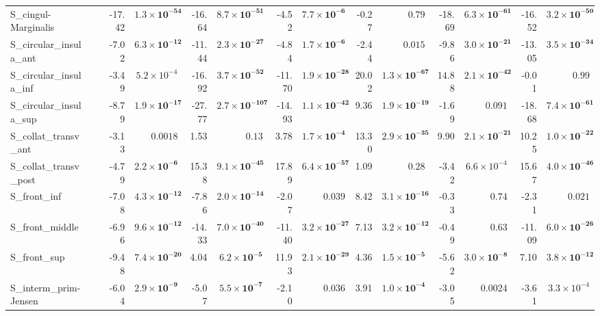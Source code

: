 {\begin{longtable}{llrrrrrrrrrrrr}
S\_cingul-Marginalis &  & -17.42 & $\mathbf{1.3{\times}10^{-54}}$ & -16.64 & $\mathbf{8.7{\times}10^{-51}}$ & -4.52 & $\mathbf{7.7{\times}10^{-6}}$ & -0.27 & $0.79$ & -18.69 & $\mathbf{6.3{\times}10^{-61}}$ & -16.52 & $\mathbf{3.2{\times}10^{-50}}$ \\
S\_circular\_insula\_ant &  & -7.02 & $\mathbf{6.3{\times}10^{-12}}$ & -11.44 & $\mathbf{2.3{\times}10^{-27}}$ & -4.84 & $\mathbf{1.7{\times}10^{-6}}$ & -2.44 & $0.015$ & -9.86 & $\mathbf{3.0{\times}10^{-21}}$ & -13.05 & $\mathbf{3.5{\times}10^{-34}}$ \\
S\_circular\_insula\_inf &  & -3.49 & $5.2{\times}10^{-4}$ & -16.92 & $\mathbf{3.7{\times}10^{-52}}$ & -11.70 & $\mathbf{1.9{\times}10^{-28}}$ & 20.02 & $\mathbf{1.3{\times}10^{-67}}$ & 14.88 & $\mathbf{2.1{\times}10^{-42}}$ & -0.01 & $0.99$ \\
S\_circular\_insula\_sup &  & -8.79 & $\mathbf{1.9{\times}10^{-17}}$ & -27.77 & $\mathbf{2.7{\times}10^{-107}}$ & -14.93 & $\mathbf{1.1{\times}10^{-42}}$ & 9.36 & $\mathbf{1.9{\times}10^{-19}}$ & -1.69 & $0.091$ & -18.68 & $\mathbf{7.4{\times}10^{-61}}$ \\
S\_collat\_transv\_ant &  & -3.13 & $0.0018$ & 1.53 & $0.13$ & 3.78 & $\mathbf{1.7{\times}10^{-4}}$ & 13.30 & $\mathbf{2.9{\times}10^{-35}}$ & 9.90 & $\mathbf{2.1{\times}10^{-21}}$ & 10.25 & $\mathbf{1.0{\times}10^{-22}}$ \\
S\_collat\_transv\_post &  & -4.79 & $\mathbf{2.2{\times}10^{-6}}$ & 15.38 & $\mathbf{9.1{\times}10^{-45}}$ & 17.89 & $\mathbf{6.4{\times}10^{-57}}$ & 1.09 & $0.28$ & -3.42 & $6.6{\times}10^{-4}$ & 15.67 & $\mathbf{4.0{\times}10^{-46}}$ \\
S\_front\_inf &  & -7.08 & $\mathbf{4.3{\times}10^{-12}}$ & -7.86 & $\mathbf{2.0{\times}10^{-14}}$ & -2.07 & $0.039$ & 8.42 & $\mathbf{3.1{\times}10^{-16}}$ & -0.33 & $0.74$ & -2.31 & $0.021$ \\
S\_front\_middle &  & -6.96 & $\mathbf{9.6{\times}10^{-12}}$ & -14.33 & $\mathbf{7.0{\times}10^{-40}}$ & -11.40 & $\mathbf{3.2{\times}10^{-27}}$ & 7.13 & $\mathbf{3.2{\times}10^{-12}}$ & -0.49 & $0.63$ & -11.09 & $\mathbf{6.0{\times}10^{-26}}$ \\
S\_front\_sup &  & -9.48 & $\mathbf{7.4{\times}10^{-20}}$ & 4.04 & $\mathbf{6.2{\times}10^{-5}}$ & 11.93 & $\mathbf{2.1{\times}10^{-29}}$ & 4.36 & $\mathbf{1.5{\times}10^{-5}}$ & -5.62 & $\mathbf{3.0{\times}10^{-8}}$ & 7.10 & $\mathbf{3.8{\times}10^{-12}}$ \\
S\_interm\_prim-Jensen &  & -6.04 & $\mathbf{2.9{\times}10^{-9}}$ & -5.07 & $\mathbf{5.5{\times}10^{-7}}$ & -2.10 & $0.036$ & 3.91 & $\mathbf{1.0{\times}10^{-4}}$ & -3.05 & $0.0024$ & -3.61 & $3.3{\times}10^{-4}$ \\

\end{longtable}}
